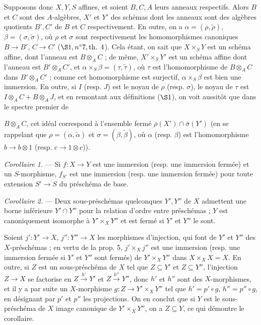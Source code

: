 Supposons donc $X, Y, S$ affines, et soient $B, C, A$ leurs anneaux respectifs. Alors $B$ et $C$ sont des $A$-algèbres, $X'$ et $Y'$ des schémas dont les anneaux sont des algèbres quotients $B', C'$ de $B$ et $C$ respectivement. En outre, on a $\alpha = (\rho, \tilde{\rho})$, $\beta = (\sigma, \tilde{\sigma})$, où $\rho$ et $\sigma$ sont respectivement les homomorphismes canoniques $B \to B'$, $C \to C'$ ($\S 1, n^\circ 7, \text{th. 4}$). Cela étant, on sait que $X \times_S Y$ est un schéma affine, dont l'anneau est $B \otimes_A C$ ; de même, $X' \times_S Y'$ est un schéma affine dont l'anneau est $B' \otimes_A C'$, et $\alpha \times_S \beta = (\tau, \tilde{\tau})$, où $\tau$ est l'homomorphisme de $B \otimes_A C$ dans $B' \otimes_A C'$ ; comme cet homomorphisme est surjectif, $\alpha \times_S \beta$ est bien une immersion. En outre, si $I$ (resp. $J$) est le noyau de $\rho$ (resp. $\sigma$), le noyau de $\tau$ est $I \otimes_A C + B \otimes_A J$, et en remontant aux définitions ($\S 1$), on voit aussitôt que dans le spectre premier de

\newpage


$B \otimes_A C$, cet idéal correspond à l'ensemble fermé $\bar{\rho}(X') \cap \bar{\sigma}(Y')$ (en se rappelant que $\rho = (\alpha, \tilde{\alpha})$ et $\sigma = (\beta, \tilde{\beta})$, où $\alpha$ (resp. $\beta$) est l'homomorphisme $b \to b \otimes 1$ (resp. $c \to 1 \otimes c$)).

\emph{Corollaire 1.} — Si $f : X \to Y$ est une immersion (resp. une immersion fermée) et un $S$-morphisme, $f_{S'}$ est une immersion (resp. une immersion fermée) pour toute extension $S' \to S$ du préschéma de base.

\emph{Corollaire 2.} — Deux sous-préschémas quelconques $Y', Y''$ de $X$ admettent une borne inférieure $Y' \cap Y''$ pour la relation d'ordre entre préschémas ; $Y$ est canoniquement isomorphe à $Y' \times_X Y''$ et est fermé si $Y'$ et $Y''$ le sont.

Soient $j' : Y' \to X$, $j'' : Y'' \to X$ les morphismes d'injection, qui font de $Y'$ et $Y''$ des $X$-préschémas ; en vertu de la prop. 5, $j' \times_X j''$ est une immersion (resp. une immersion fermée si $Y'$ et $Y''$ sont fermés) de $Y' \times_X Y''$ dans $X \times_X X = X$. En outre, si $Z$ est un sous-préschéma de $X$ tel que $Z \subseteq Y'$ et $Z \subseteq Y''$, l'injection $Z \to X$ se factorise en $Z \xrightarrow{h'} Y'$ et $Z \xrightarrow{h''} Y''$, donc $h'$ et $h''$ sont des $X$-morphismes, et il y a par suite un $X$-morphisme $g : Z \to Y' \times_X Y''$ tel que $h' = p' \circ g$, $h'' = p'' \circ g$, en désignant par $p'$ et $p''$ les projections. On en conclut que si $Y$ est le sous-préschéma de $X$ image canonique de $Y' \times_X Y''$, on a $Z \subseteq Y$, ce qui démontre le corollaire.

